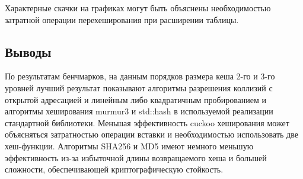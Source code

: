 \documentclass[18pt]{article}
\begin{document}
\par
Характерные скачки на графиках могут быть объяснены необходимостью 
затратной операции перехеширования при расширении таблицы.

\subsection{Выводы}
По результатам бенчмарков, на данным порядков размера кеша 2-го и 3-го уровней
лучший результат показывают алгоритмы разрешения коллизий с открытой адресацией
и линейным либо квадратичным пробированием и алгоритмы хеширования 
murmur3 и std::hash в используемой реализации стандартной библиотеки.
Меньшая эффективность cuckoo хеширования может объясняться затратностью
операции вставки и необходимостью использовать две хеш-функции.
Алгоритмы SHA256 и MD5 имеют немного меньшую эффективность из-за избыточной 
длины возвращаемого хеша и большей сложности, обеспечивающей криптографическую
стойкость.
\end{document}
